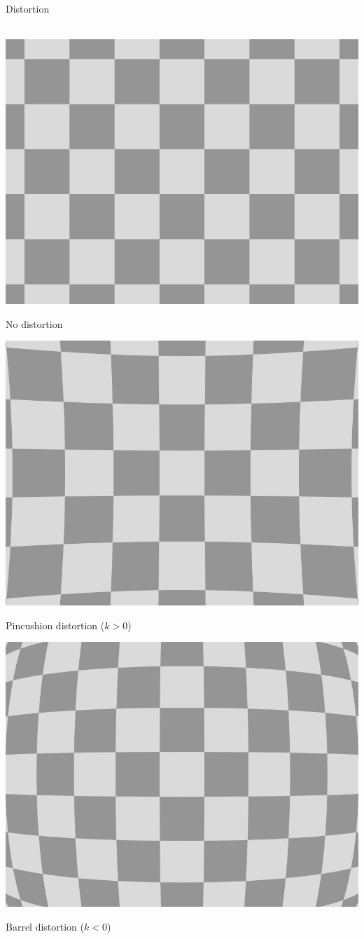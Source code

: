 \documentclass[utf8,stillsansserifmath,fleqn,t]{beamer}
\begin{document}
\begin{frame}[label=distortion]
\frametitle{\insertsection}
Distortion\\~\\
\begin{minipage}{.49\textwidth}
\centerline{\includegraphics[width=.6\textwidth]{./fig/distortion-none.png}}
\centerline{No distortion}
\vspace{1ex}
\centerline{\includegraphics[width=.6\textwidth]{./fig/distortion-pincushion.png}}
\centerline{Pincushion distortion ($k>0$)}
\end{minipage}\hfill
\begin{minipage}{.49\textwidth}
\centerline{\includegraphics[width=.6\textwidth]{./fig/distortion-barrel.png}}
\centerline{Barrel distortion ($k < 0$)}
\vspace{1ex}

\end{minipage}
\end{frame}
\end{document}
